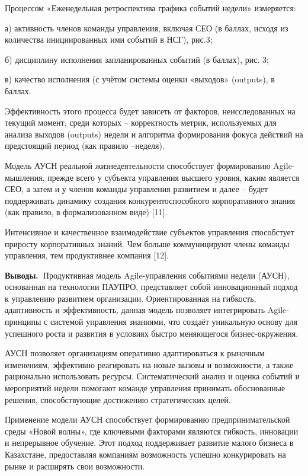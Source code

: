 \begin{multicols}{2}


Процессом «Еженедельная ретроспектива графика событий недели»
измеряется:

а) активность членов команды управления, включая СЕО (в баллах, исходя
из количества инициированных ими событий в НСГ), рис.3;

б) дисциплину исполнения запланированных событий (в баллах), рис. 3;

в) качество исполнения (с учётом системы оценки «выходов» (outputs), в
баллах.

Эффективность этого процесса будет зависеть от факторов, неисследованных
на текущий момент, среди которых -- корректность метрик, используемых
для анализа выходов (outputs) недели и алгоритма формирования фокуса
действий на предстоящий период (как правило --неделя).

Модель АУСН реальной жизнедеятельности способствует формированию
Agile-мышления, прежде всего у субъекта управления высшего уровня, каким
является СЕО, а затем и у членов команды управления развитием и далее --
будет поддерживать динамику создания конкурентоспособного корпоративного
знания (как правило, в формализованном виде) {[}11{]}.

Интенсивное и качественное взаимодействие субъектов управления
способстует приросту корпоративных знаний. Чем больше коммуницируют
члены команды управления, тем продуктивнее компания {[}12{]}.

{\bfseries Выводы.~}Продуктивная модель Agile-управления событиями недели
(АУСН), основанная на технологии ПАУПРО, представляет собой
инновационный подход к управлению развитием организации. Ориентированная
на гибкость, адаптивность и эффективность, данная модель позволяет
интегрировать Agile-принципы с системой управления знаниями, что создаёт
уникальную основу для успешного роста и развития в условиях быстро
меняющегося бизнес-окружения.

АУСН позволяет организациям оперативно адаптироваться к рыночным
изменениям, эффективно реагировать на новые вызовы и возможности, а
также рационально использовать ресурсы. Систематический анализ и оценка
событий и мероприятий недели помогают команде управления принимать
обоснованные решения, способствующие достижению стратегических целей.

Применение модели АУСН способствует формированию предпринимательской
среды «Новой волны», где ключевыми факторами являются гибкость,
инновации и непрерывное обучение. Этот подход поддерживает развитие
малого бизнеса в Казахстане, предоставляя компаниям возможность успешно
конкурировать на рынке и расширять свои возможности.


\end{multicols}
